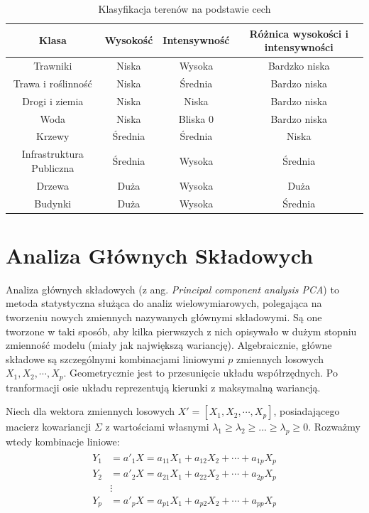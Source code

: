 \begin{table}[h!]
    \centering
    \caption{Klasyfikacja terenów na podstawie cech}
    \label{tab:przypisanie_do_klas}
    \begin{tabular}{|c|c|c|c|}
        \hline
        Klasa & Wysokość & Intensywność & Różnica wysokości i intensywności\\
        \hline
        Trawniki & Niska & Wysoka & Bardzko niska\\
        \hline
        Trawa i roślinność & Niska & Średnia & Bardzo niska\\
        \hline
        Drogi i ziemia & Niska & Niska & Bardzo niska\\
        \hline
        Woda & Niska & Bliska 0 & Bardzo niska\\
        \hline
        Krzewy & Średnia & Średnia & Niska\\
        \hline
        Infrastruktura Publiczna & Średnia & Wysoka & Średnia\\
        \hline
        Drzewa & Duża & Wysoka & Duża\\
        \hline
        Budynki & Duża & Wysoka & Średnia\\
        \hline
    \end{tabular}
\end{table}

\section{Analiza Głównych Składowych}

Analiza głównych składowych (z ang. \textit{Principal component analysis PCA}) to metoda statystyczna służąca do analiz wielowymiarowych, polegająca na tworzeniu nowych zmiennych nazywanych głównymi składowymi.
Są one tworzone w taki sposób, aby kilka pierwszych z nich opisywało w dużym stopniu zmienność modelu (miały jak największą wariancję). Algebraicznie, główne składowe są szczególnymi kombinacjami liniowymi $p$
zmiennych losowych $X_{1}, X_{2}, \cdots, X_{p}$. Geometrycznie jest to przesunięcie układu współrzędnych. Po tranformacji osie układu reprezentują kierunki
z maksymalną wariancją\cite{johnson2002}.

Niech dla wektora zmiennych losowych $X'=[X_{1}, X_{2}, \cdots, X_{p}]$, posiadającego macierz kowariancji $\Sigma$ z wartościami własnymi $\lambda_{1} \geqslant \lambda_{2} \geqslant ... \geqslant \lambda_{p}
\geqslant 0$. Rozważmy wtedy kombinacje liniowe:
\begin{align}
    \begin{split}
        Y_{1} &= a'_{1}X = a_{11}X_{1} + a_{12}X_{2} + \cdots + a_{1p}X_{p} \\
        Y_{2} &= a'_{2}X = a_{21}X_{1} + a_{22}X_{2} + \cdots + a_{2p}X_{p} \\
        &\vdots \\
        Y_{p} &= a'_{p}X = a_{p1}X_{1} + a_{p2}X_{2} + \cdots + a_{pp}X_{p}
    \end{split}
\end{align}

